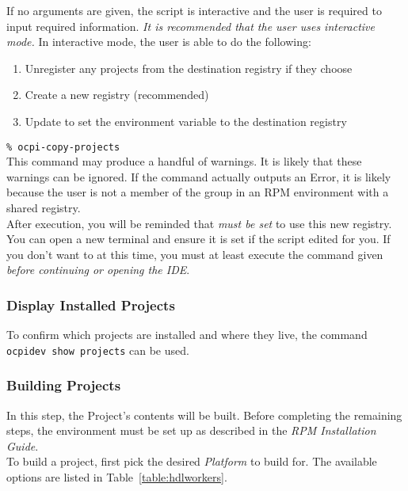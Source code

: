 If no arguments are given, the script is interactive and the user is required to
input required information. \textit{It is recommended that the user uses interactive mode.} In interactive mode, the user is able to do the
following:
\begin{enumerate}
\item Unregister any projects from the destination registry if they choose
\item Create a new registry (recommended)
\item Update  to set the environment variable  to the destination registry
\end{enumerate}

\verb+% ocpi-copy-projects+ \\

This command may produce a handful of warnings. It is likely that these warnings can be ignored. If the command actually outputs an Error, it is likely because the user is not a member of the  group in an RPM environment with a shared registry.\\

After execution, you will be reminded that  \textit{must be set} to use this new registry. You can open a new terminal and ensure it is set if the script edited  for you.
If you don't want to at this time, you must at least execute the  command given \textit{before continuing or opening the IDE}.\\

\subsubsection{Display Installed Projects}
To confirm which projects are installed and where they live, the command \texttt{ocpidev show projects} can be used.
\subsubsection{Building Projects}
\label{subsubsec:buildworkers}
In this step, the Project's contents will be built. Before completing the remaining steps, the environment must be set up as described in the \textit{RPM Installation Guide}.\\

To build a project, first pick the desired \textit{Platform} to build for. The available options are listed in Table~\ref{table:hdlworkers}.\\

